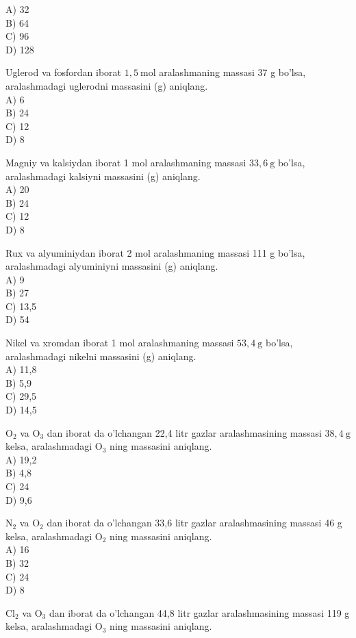 A) 32\\
B) 64\\
C) 96\\
D) 128
  \item Uglerod va fosfordan iborat $1,5 \mathrm{~mol}$ aralashmaning massasi 37 g bo'lsa, aralashmadagi uglerodni massasini (g) aniqlang.\\
A) 6\\
B) 24\\
C) 12\\
D) 8
  \item Magniy va kalsiydan iborat 1 mol aralashmaning massasi $33,6 \mathrm{~g}$ bo'lsa, aralashmadagi kalsiyni massasini (g) aniqlang.\\
A) 20\\
B) 24\\
C) 12\\
D) 8
  \item Rux va alyuminiydan iborat 2 mol aralashmaning massasi 111 g bo'lsa, aralashmadagi alyuminiyni massasini (g) aniqlang.\\
A) 9\\
B) 27\\
C) 13,5\\
D) 54
  \item Nikel va xromdan iborat 1 mol aralashmaning massasi $53,4 \mathrm{~g}$ bo'lsa, aralashmadagi nikelni massasini (g) aniqlang.\\
A) 11,8\\
B) 5,9\\
C) 29,5\\
D) 14,5
  \item $\mathrm{O}_{2}$ va $\mathrm{O}_{3}$ dan iborat da o'lchangan 22,4 litr gazlar aralashmasining massasi $38,4 \mathrm{~g}$ kelsa, aralashmadagi $\mathrm{O}_{3}$ ning massasini aniqlang.\\
A) 19,2\\
B) 4,8\\
C) 24\\
D) 9,6
  \item $\mathrm{N}_{2}$ va $\mathrm{O}_{2}$ dan iborat da o'lchangan 33,6 litr gazlar aralashmasining massasi 46 g kelsa, aralashmadagi $\mathrm{O}_{2}$ ning massasini aniqlang.\\
A) 16\\
B) 32\\
C) 24\\
D) 8
  \item $\mathrm{Cl}_{2}$ va $\mathrm{O}_{3}$ dan iborat da o'lchangan 44,8 litr gazlar aralashmasining massasi 119 g kelsa, aralashmadagi $\mathrm{O}_{3}$ ning massasini aniqlang.\\
